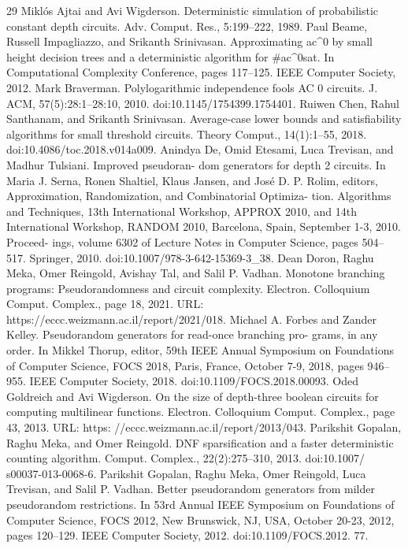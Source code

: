 \begin{thebibliography}{29}
 Miklós Ajtai and Avi Wigderson. Deterministic simulation of probabilistic constant depth circuits. Adv. Comput. Res., 5:199–222, 1989.
 Paul Beame, Russell Impagliazzo, and Srikanth Srinivasan. Approximating ac\textasciicircum{}0 by small height decision trees and a deterministic algorithm for \#ac\textasciicircum{}0sat. In Computational Complexity Conference, pages 117–125. IEEE Computer Society, 2012.
 Mark Braverman. Polylogarithmic independence fools AC 0 circuits. J. ACM, 57(5):28:1–28:10, 2010. doi:10.1145/1754399.1754401.
 Ruiwen Chen, Rahul Santhanam, and Srikanth Srinivasan. Average-case lower bounds and satisfiability algorithms for small threshold circuits. Theory Comput., 14(1):1–55, 2018. doi:10.4086/toc.2018.v014a009.
 Anindya De, Omid Etesami, Luca Trevisan, and Madhur Tulsiani. Improved pseudoran- dom generators for depth 2 circuits. In Maria J. Serna, Ronen Shaltiel, Klaus Jansen, and José D. P. Rolim, editors, Approximation, Randomization, and Combinatorial Optimiza- tion. Algorithms and Techniques, 13th International Workshop, APPROX 2010, and 14th International Workshop, RANDOM 2010, Barcelona, Spain, September 1-3, 2010. Proceed- ings, volume 6302 of Lecture Notes in Computer Science, pages 504–517. Springer, 2010. doi:10.1007/978-3-642-15369-3\_38.
 Dean Doron, Raghu Meka, Omer Reingold, Avishay Tal, and Salil P. Vadhan. Monotone branching programs: Pseudorandomness and circuit complexity. Electron. Colloquium Comput. Complex., page 18, 2021. URL: https://eccc.weizmann.ac.il/report/2021/018.
 Michael A. Forbes and Zander Kelley. Pseudorandom generators for read-once branching pro- grams, in any order. In Mikkel Thorup, editor, 59th IEEE Annual Symposium on Foundations of Computer Science, FOCS 2018, Paris, France, October 7-9, 2018, pages 946–955. IEEE Computer Society, 2018. doi:10.1109/FOCS.2018.00093.
 Oded Goldreich and Avi Wigderson. On the size of depth-three boolean circuits for computing multilinear functions. Electron. Colloquium Comput. Complex., page 43, 2013. URL: https: //eccc.weizmann.ac.il/report/2013/043.
 Parikshit Gopalan, Raghu Meka, and Omer Reingold. DNF sparsification and a faster deterministic counting algorithm. Comput. Complex., 22(2):275–310, 2013. doi:10.1007/ s00037-013-0068-6.
 Parikshit Gopalan, Raghu Meka, Omer Reingold, Luca Trevisan, and Salil P. Vadhan. Better pseudorandom generators from milder pseudorandom restrictions. In 53rd Annual IEEE Symposium on Foundations of Computer Science, FOCS 2012, New Brunswick, NJ, USA, October 20-23, 2012, pages 120–129. IEEE Computer Society, 2012. doi:10.1109/FOCS.2012. 77.

\end{thebibliography}
